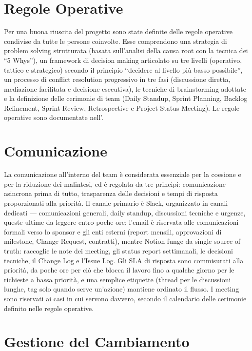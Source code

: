 \section{Regole Operative}

Per una buona riuscita del progetto sono state definite delle regole operative condivise da tutte le persone coinvolte. Esse comprendono una strategia di problem solving strutturata (basata sull'analisi della causa root con la tecnica dei ``5 Whys''), un framework di decision making articolato su tre livelli (operativo, tattico e strategico) secondo il principio ``decidere al livello più basso possibile'', un processo di conflict resolution progressivo in tre fasi (discussione diretta, mediazione facilitata e decisione esecutiva), le tecniche di brainstorming adottate e la definizione delle cerimonie di team (Daily Standup, Sprint Planning, Backlog Refinement, Sprint Review, Retrospective e Project Status Meeting). Le regole operative sono documentate nell'.

\section{Comunicazione}

La comunicazione all'interno del team è considerata essenziale per la coesione e per la riduzione dei malintesi, ed è regolata da tre principi: comunicazione asincrona prima di tutto, trasparenza delle decisioni e tempi di risposta proporzionati alla priorità. Il canale primario è Slack, organizzato in canali dedicati --- comunicazioni generali, daily standup, discussioni tecniche e urgenze, queste ultime da leggere entro poche ore; l'email è riservata alle comunicazioni formali verso lo sponsor e gli enti esterni (report mensili, approvazioni di milestone, Change Request, contratti), mentre Notion funge da single source of truth: raccoglie le note dei meeting, gli status report settimanali, le decisioni tecniche, il Change Log e l'Issue Log. Gli SLA di risposta sono commisurati alla priorità, da poche ore per ciò che blocca il lavoro fino a qualche giorno per le richieste a bassa priorità, e una semplice etiquette (thread per le discussioni lunghe, tag solo quando serve un'azione) mantiene ordinato il flusso. I meeting sono riservati ai casi in cui servono davvero, secondo il calendario delle cerimonie definito nelle regole operative.

\section{Gestione del Cambiamento}

